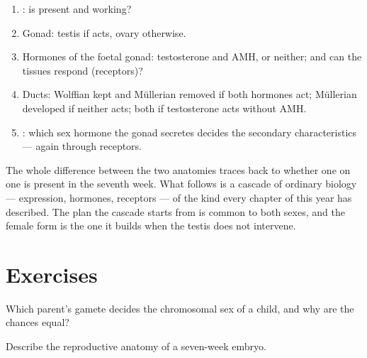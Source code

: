 \begin{method}\label{met:g11:becoming-male-female:case}
\begin{enumerate}
  \item {}: is  present and working?
  \item Gonad: testis if  acts, ovary otherwise.
  \item Hormones of the foetal gonad: testosterone and AMH, or neither;
        and can the tissues respond (receptors)?
  \item Ducts: Wolffian kept and Müllerian removed if both hormones
        act; Müllerian developed if neither acts; both if testosterone
        acts without AMH.
  \item {}: which sex hormone the gonad secretes decides the
        secondary characteristics --- again through receptors.
\end{enumerate}
\end{method}

\begin{remark}\label{rem:g11:becoming-male-female:onegene}
The whole difference between the two anatomies traces back to whether
one  on one  is present in the seventh week. What
follows is a cascade of ordinary  biology ---  expression,
hormones, receptors --- of the kind every chapter of this year has
described. The plan the cascade starts from is common to both sexes,
and the female form is the one it builds when the testis does not
intervene.
\end{remark}

\section{Exercises}

\begin{exercise}[$\star$]\label{exo:g11:becoming-male-female:1}
Which parent's gamete decides the chromosomal sex of a child, and why
are the chances equal?
\end{exercise}

\begin{exercise}[$\star$]\label{exo:g11:becoming-male-female:2}
Describe the reproductive anatomy of a seven-week embryo.
\end{exercise}

